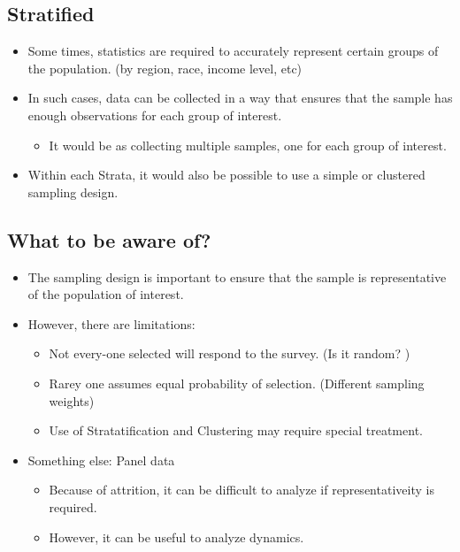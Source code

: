 \documentclass[
  letterpaper,
  DIV=11,
  numbers=noendperiod]{scrartcl}
\providecommand{\tightlist}{%
  \setlength{\itemsep}{0pt}\setlength{\parskip}{0pt}}\usepackage{longtable,booktabs,array}
\begin{document}
\subsection{Stratified}

\begin{itemize}
\tightlist
\item
  Some times, statistics are required to accurately represent certain
  groups of the population. (by region, race, income level, etc)
\item
  In such cases, data can be collected in a way that ensures that the
  sample has enough observations for each group of interest.

  \begin{itemize}
  \tightlist
  \item
    It would be as collecting multiple samples, one for each group of
    interest.
  \end{itemize}
\item
  Within each Strata, it would also be possible to use a simple or
  clustered sampling design.
\end{itemize}

\subsection{What to be aware of?}\label{what-to-be-aware-of}

\begin{itemize}
\tightlist
\item
  The sampling design is important to ensure that the sample is
  representative of the population of interest.
\item
  However, there are limitations:

  \begin{itemize}
  \tightlist
  \item
    Not every-one selected will respond to the survey. (Is it random? )
  \item
    Rarey one assumes equal probability of selection. (Different
    sampling weights)
  \item
    Use of Stratatification and Clustering may require special
    treatment.
  \end{itemize}
\item
  Something else: Panel data

  \begin{itemize}
  \tightlist
  \item
    Because of attrition, it can be difficult to analyze if
    representativeity is required.
  \item
    However, it can be useful to analyze dynamics.
  \end{itemize}
\end{itemize}
\end{document}
